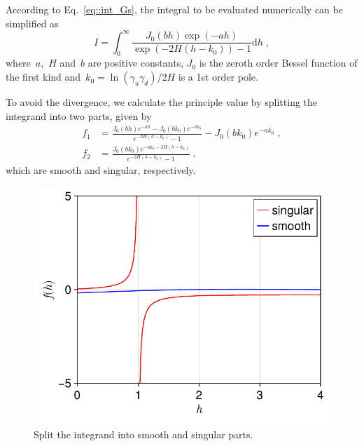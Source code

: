 According to Eq.~\eqref{eq::int_Gs}, the integral to be evaluated numerically can be simplified as
\begin{equation}\label{eq::int_I}
    I = \int_0^{\infty} \frac{J_0(b h) \exp{(- a h)}}{\exp{( - 2 H (h - k_0))} - 1} \mathrm{d}h\;,
\end{equation}
where~$a$,~$H$ and~$b$ are positive constants, $J_0$ is the zeroth order Bessel function of the first kind and~$k_0 = {\ln{(\gamma_u \gamma_d)}} / {2H}$ is a 1st order pole.

To avoid the divergence, we calculate the principle value by splitting the integrand into two parts, given by
\begin{equation}
    \begin{split}
        f_{1} &=  \frac{J_0(b h) e^{- a h} - J_0(b k_0) e^{- a k_0}}{e^{- 2 H (h - k_0)} - 1} - J_0(b k_0) e^{- a k_0} \;, \\
        f_{2} &= \frac{J_0(b k_0) e^{- a k_0 - 2 H (h - k_0)}}{e^{- 2 H (h - k_0)} - 1} \;,
    \end{split}
\end{equation}
which are smooth and singular, respectively.

\begin{figure}[ht]
    \centering
    \includegraphics[width = 0.5\linewidth]{figs/fi.pdf}
    \caption{Split the integrand into smooth and singular parts.}
    \label{fig:split}
\end{figure}


